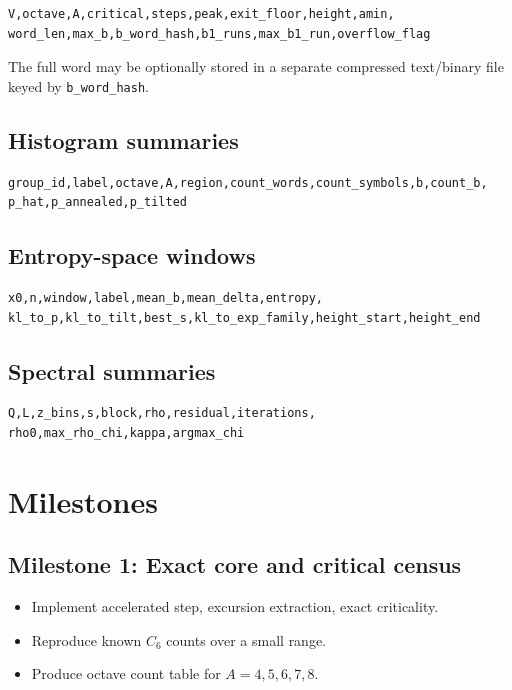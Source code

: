 \documentclass[11pt]{article}
\begin{document}
\begin{verbatim}
V,octave,A,critical,steps,peak,exit_floor,height,amin,
word_len,max_b,b_word_hash,b1_runs,max_b1_run,overflow_flag
\end{verbatim}

The full word may be optionally stored in a separate compressed text/binary file keyed by \texttt{b\_word\_hash}.

\subsection{Histogram summaries}

\begin{verbatim}
group_id,label,octave,A,region,count_words,count_symbols,b,count_b,
p_hat,p_annealed,p_tilted
\end{verbatim}

\subsection{Entropy-space windows}

\begin{verbatim}
x0,n,window,label,mean_b,mean_delta,entropy,
kl_to_p,kl_to_tilt,best_s,kl_to_exp_family,height_start,height_end
\end{verbatim}

\subsection{Spectral summaries}

\begin{verbatim}
Q,L,z_bins,s,block,rho,residual,iterations,
rho0,max_rho_chi,kappa,argmax_chi
\end{verbatim}

\section{Milestones}

\subsection*{Milestone 1: Exact core and critical census}
\begin{itemize}
  \item Implement accelerated step, excursion extraction, exact criticality.
  \item Reproduce known $C_6$ counts over a small range.
  \item Produce octave count table for $A=4,5,6,7,8$.
\end{itemize}
\end{document}
